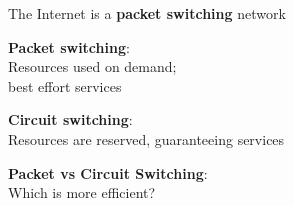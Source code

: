 \begin{frame}[plain]\begin{center}
\end{center}\end{frame}

\begin{frame}\begin{center}\large
The Internet is a \textbf{packet switching} network
\end{center}\end{frame}

\begin{frame}\begin{center}\large
\textbf{Packet switching}:\\\large Resources used on demand;\\best effort services
\end{center}\end{frame}

\begin{frame}\begin{center}\large
\textbf{Circuit switching}:\\\large Resources are reserved, guaranteeing services
\end{center}\end{frame}

\begin{frame}\begin{center}\large
\textbf{Packet vs Circuit Switching}:\\\large Which is more efficient?
\end{center}\end{frame}

